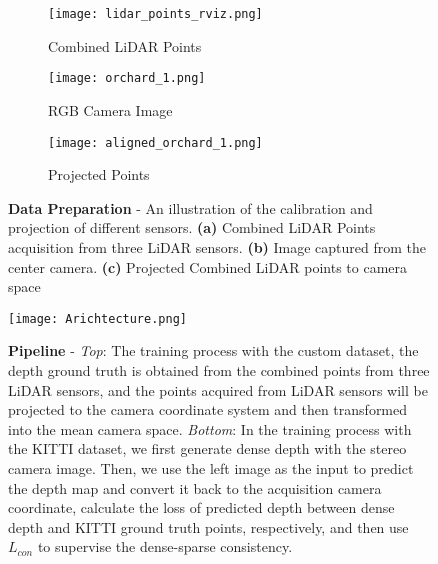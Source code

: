     \begin{figure}[htbp]
         \centering
         \begin{subfigure}[t]{0.23\textwidth}
             \centering
             \texttt{[image: lidar\_points\_rviz.png]}
             \caption{Combined LiDAR Points}
             \label{fig:rviz lidar points}
         \end{subfigure}
         \hfill
         \begin{subfigure}[t]{0.23\textwidth}
             \centering
             \texttt{[image: orchard\_1.png]}
             \caption{RGB Camera Image}
             \label{fig:orchard scene 1}
         \end{subfigure}
         \hfill
         \begin{subfigure}[t]{0.23\textwidth}
             \centering
             \texttt{[image: aligned\_orchard\_1.png]}
             \caption{Projected Points}
             \label{fig:visual points in orchard 1}
         \end{subfigure}
            \caption{ \textbf{Data Preparation} - An illustration of the calibration and projection of different sensors. \textbf{(a)} Combined LiDAR Points acquisition from three LiDAR sensors. \textbf{(b)} Image captured from the center camera. \textbf{(c)} Projected Combined LiDAR points to camera space}
            \label{fig:Data Preparation Demostration}
    \end{figure}
    
\begin{figure*}[t]
    \centering
    \texttt{[image: Arichtecture.png]}
    \caption{\textbf{Pipeline} - \textit{Top}: The training process with the custom dataset, the depth ground truth is obtained from the combined points from three LiDAR sensors, and the points acquired from LiDAR sensors will be projected to the camera coordinate system and then transformed into the mean camera space. \textit{Bottom}: In the training process with the KITTI dataset, we first generate dense depth with the stereo camera image. Then, we use the left image as the input to predict the depth map and convert it back to the acquisition camera coordinate, calculate the loss of predicted depth between dense depth and KITTI ground truth points, respectively, and then use \(L_{con}\) to supervise the dense-sparse consistency.}
    \label{fig:Model Architecture}
\end{figure*}
